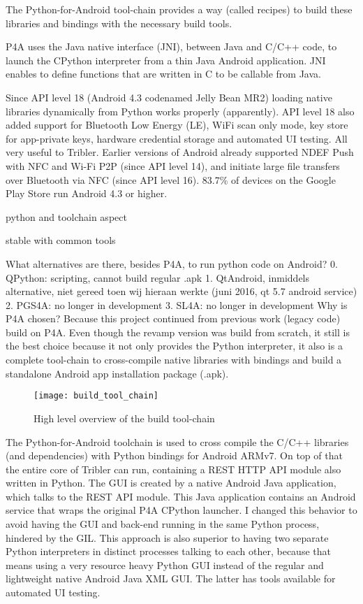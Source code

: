 The Python-for-Android tool-chain provides a way (called recipes) to build these libraries and bindings with the necessary build tools.

P4A uses the Java native interface (JNI), between Java and C/C++ code, to launch the CPython interpreter from a thin Java Android application.
JNI enables to define functions that are written in C to be callable from Java.


Since API level 18 (Android 4.3 codenamed Jelly Bean MR2) loading native libraries dynamically from Python works properly (apparently).
API level 18 also added support for Bluetooth Low Energy (LE), WiFi scan only mode, key store for app-private keys, hardware credential storage and automated UI testing.
All very useful to Tribler.
Earlier versions of Android already supported NDEF Push with NFC and Wi-Fi P2P (since API level 14), and initiate large file transfers over Bluetooth via NFC (since API level 16).
83.7\% of devices on the Google Play Store run Android 4.3 or higher.


python and toolchain aspect

stable with common tools


What alternatives are there, besides P4A, to run python code on Android?
0. QPython: scripting, cannot build regular .apk
1. QtAndroid, inmiddels alternative, niet gereed toen wij hieraan werkte (juni 2016, qt 5.7 android service)
2. PGS4A: no longer in development
3. SL4A: no longer in development
Why is P4A chosen?
Because this project continued from previous work (legacy code) build on P4A.
Even though the revamp version was build from scratch, it still is the best choice because it not only provides the Python interpreter, it also is a complete tool-chain to cross-compile native libraries with bindings and build a standalone Android app installation package (.apk).


\begin{figure}[h]
	\centering
	\texttt{[image: build\_tool\_chain]}
	\caption{High level overview of the build tool-chain}
	\label{fig:build_tool_chain}
\end{figure}


The Python-for-Android toolchain is used to cross compile the C/C++ libraries (and dependencies) with Python bindings for Android ARMv7.
On top of that the entire core of Tribler can run, containing a REST HTTP API module also written in Python.
The GUI is created by a native Android Java application, which talks to the REST API module.
This Java application contains an Android service that wraps the original P4A CPython launcher.
I changed this behavior to avoid having the GUI and back-end running in the same Python process, hindered by the GIL.
This approach is also superior to having two separate Python interpreters in distinct processes talking to each other, because that means using a very resource heavy Python GUI instead of the regular and lightweight native Android Java XML GUI.
The latter has tools available for automated UI testing.

